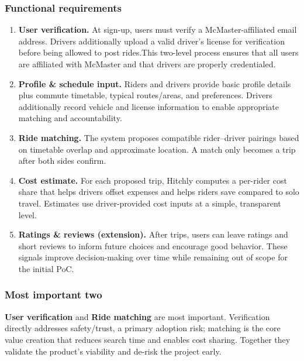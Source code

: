\documentclass[12pt,letterpaper]{article}
\begin{document}
\subsubsection*{Functional requirements}
\begin{enumerate}
  \item \textbf{User verification.}
  At sign-up, users must verify a McMaster-affiliated email address. Drivers additionally upload a valid driver's license for verification before being allowed to post rides.This two-level process ensures that all users are affiliated with McMaster and that drivers are properly credentialed.

  \item \textbf{Profile \& schedule input.}
  Riders and drivers provide basic profile details plus commute timetable, typical routes/areas, and preferences.
  Drivers additionally record vehicle and license information to enable appropriate matching and accountability.

  \item \textbf{Ride matching.}
  The system proposes compatible rider–driver pairings based on timetable overlap and approximate location.
  A match only becomes a trip after both sides confirm.

  \item \textbf{Cost estimate.}
  For each proposed trip, Hitchly computes a per-rider cost share that helps drivers offset expenses and helps riders save compared to solo travel.
  Estimates use driver-provided cost inputs at a simple, transparent level.

  \item \textbf{Ratings \& reviews (extension).}
  After trips, users can leave ratings and short reviews to inform future choices and encourage good behavior.
  These signals improve decision-making over time while remaining out of scope for the initial PoC.
\end{enumerate}

\subsubsection*{Most important two}
\textbf{User verification} and \textbf{Ride matching} are most important.
Verification directly addresses safety/trust, a primary adoption risk; matching is the core value creation that reduces search time and enables cost sharing. Together they validate the product’s viability and de-risk the project early.
\end{document}
